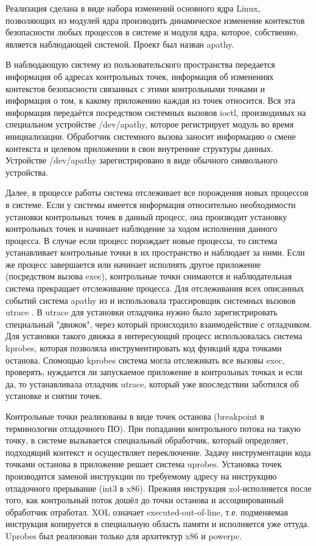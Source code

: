Реализация сделана в виде набора изменений основного ядра Linux,
позволяющих из модулей ядра производить динамическое изменение
контекстов безопасности любых процессов в системе и модуля ядра,
которое, собственно, является наблюдающей системой. Проект был назван
apathy.

В наблюдающую систему из пользовательского пространства передается
информация об адресах контрольных точек, информация об изменениях
контекстов безопасности связанных с этими контрольными точками и
информация о том, к какому приложению каждая из точек относится. Вся эта
информация передаётся посредством системных вызовов ioctl, производимых
на специальном устройстве /dev/apathy, которое регистрирует модуль во
время инициализации. Обработчик системного вызова заносит информацию о
смене контекста и целевом приложении в свои внутренние структуры данных. 
Устройстве /dev/apathy зарегистрировано в виде обычного символьного
устройства.

Далее, в процессе работы система отслеживает все порождения новых
процессов в системе. Если у системы имеется информация относительно
необходимости установки контрольных точек в данный процесс, она
производит установку контрольных точек и начинает наблюдение за ходом
исполнения данного процесса. В случае если процесс порождает новые
процессы, то система устанавливает контрольные точки в их пространство и
наблюдает за ними. Если же процесс завершается или начинает исполнять
другое приложение (посредством вызова exec), контрольные точки снимаются
и наблюдательная система прекращает отслеживание процесса. Для
отслеживания всех описанных событий система apathy из \cite{bush} и
\cite{sacharov} использовала трассировщик системных вызовов utrace
\cite{utrace}. В utrace для установки отладчика нужно было
зарегистрировать специальный "движок", через который происходило
взаимодействие с отладчиком. Для установки такого движка в интересующий
процесс использовалась система kprobes, которая позволяла
инструментировать код функций ядра точками останова. Спомощью kprobes
система могла отслеживать все вызовы exec, проверять, нуждается ли
запускаемое приложение в контрольных точках и если да, то устанавливала
отладчик utrace, который уже впоследствии заботился об установке и
снятии точек.

Контрольные точки реализованы в виде точек останова (breakpoint в
терминологии отладочного ПО). При попадании контрольного потока на такую
точку, в системе вызывается специальный обработчик, который определяет,
подходящий контекст и осуществляет переключение. Задачу инструментации
кода точками останова в приложение решает система uprobes.  Установка
точек производится заменой инструкции по требуемому адресу на инструкцию
отладочного прерывание (int3 в x86). Прежняя инструкция xol-исполняется
после того, как контрольный поток дошёл до точки останова и
ассоциированный обработчик отработал. XOL означает executed-out-of-line,
т.е. подменяемая инструкция копируется в специальную область памяти и
исполняется уже оттуда. Uprobes был реализован только для архитектур x86
и powerpc.

